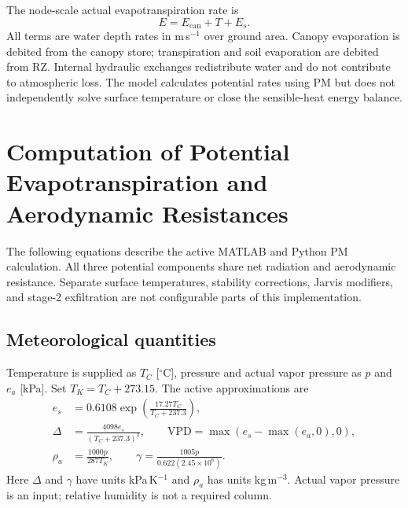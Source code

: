 \documentclass[12pt]{article}
\begin{document}
The node-scale actual evapotranspiration rate is
\begin{equation}
E=E_{\mathrm{can}}+T+E_s.
\label{eq:et_sum_actual}
\end{equation}
All terms are water depth rates in m\,s$^{-1}$ over ground area. Canopy evaporation is debited from the canopy store; transpiration and soil evaporation are debited from RZ. Internal hydraulic exchanges redistribute water and do not contribute to atmospheric loss. The model calculates potential rates using PM but does not independently solve surface temperature or close the sensible-heat energy balance.

\section{Computation of Potential Evapotranspiration and Aerodynamic Resistances}
\label{sec:potET_ra_rs}

The following equations describe the active MATLAB and Python PM calculation. All three potential components share net radiation and aerodynamic resistance. Separate surface temperatures, stability corrections, Jarvis modifiers, and stage-2 exfiltration are not configurable parts of this implementation.

\subsection{Meteorological quantities}
Temperature is supplied as $T_C$ [$^\circ$C], pressure and actual vapor pressure as $p$ and $e_a$ [kPa]. Set $T_K=T_C+273.15$. The active approximations are
\begin{align}
e_s&=0.6108\exp\left(\frac{17.27T_C}{T_C+237.3}\right),\\
\Delta&=\frac{4098e_s}{(T_C+237.3)^2},\qquad \mathrm{VPD}=\max(e_s-\max(e_a,0),0),\\
\rho_a&=\frac{1000p}{287T_K},\qquad \gamma=\frac{1005p}{0.622(2.45\times10^6)}.
\end{align}
Here $\Delta$ and $\gamma$ have units kPa\,K$^{-1}$ and $\rho_a$ has units kg\,m$^{-3}$. Actual vapor pressure is an input; relative humidity is not a required column.
\end{document}
